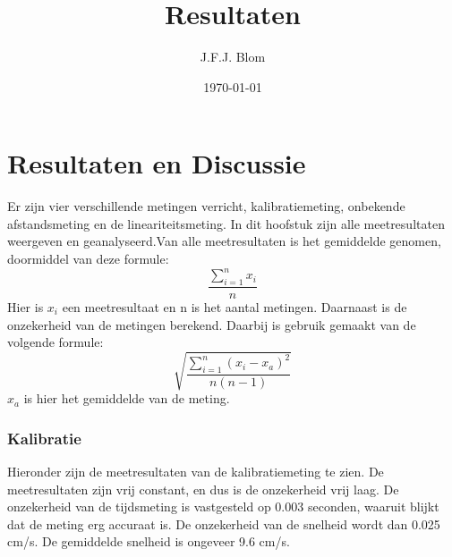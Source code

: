 \documentclass{thema}
\title{Resultaten}
\author{J.F.J. Blom}
\date{\today}
\begin{document}
\chapter{Resultaten en Discussie}
Er zijn vier verschillende metingen verricht, kalibratiemeting, onbekende afstandsmeting en de lineariteitsmeting. In dit hoofstuk zijn alle meetresultaten weergeven en geanalyseerd.Van alle meetresultaten is het gemiddelde genomen, doormiddel van deze formule:
$$\frac{\sum_{i=1}^{n}x_i}{n}$$
Hier is $x_i$ een meetresultaat en n is het aantal metingen. 
Daarnaast is de onzekerheid van de metingen berekend. Daarbij is gebruik gemaakt van de volgende formule:
$$\sqrt{\frac{\sum_{i=1}^{n}( x_i-x_a)^2}{n(n-1)}}$$
$x_a$ is hier het gemiddelde van de meting.
\subsection*{Kalibratie}
Hieronder zijn de meetresultaten van de kalibratiemeting te zien. De meetresultaten zijn vrij constant, en dus is de onzekerheid vrij laag. De onzekerheid van de tijdsmeting is vastgesteld op 0.003 seconden, waaruit blijkt dat de meting erg accuraat is. De onzekerheid van de snelheid wordt dan 0.025 cm/s. De gemiddelde snelheid is ongeveer 9.6 cm/s.
\end{document}
